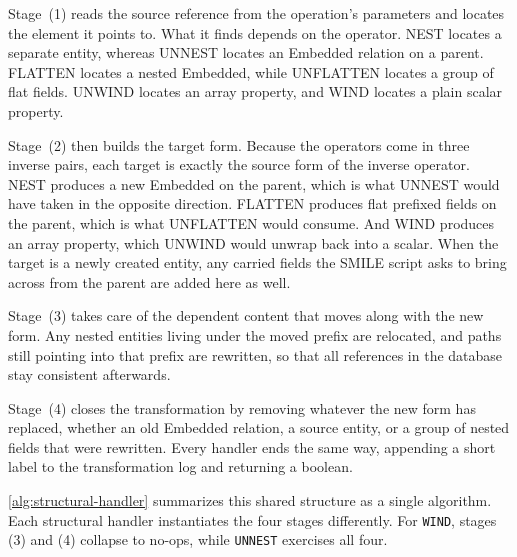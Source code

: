   Stage~(1) reads the source reference from the operation's parameters
  and locates the element it points to. What it finds depends on the
  operator. NEST locates a separate entity, whereas UNNEST locates an
  Embedded relation on a parent. FLATTEN locates a nested Embedded, while
  UNFLATTEN locates a group of flat fields. UNWIND locates an array
  property, and WIND locates a plain scalar property.

Stage~(2) then builds the target form. Because the operators come in
  three inverse pairs, each target is exactly the source form of the
  inverse operator. NEST produces a new Embedded on the parent, which is
  what UNNEST would have taken in the opposite direction. FLATTEN
  produces flat prefixed fields on the parent, which is what UNFLATTEN
  would consume. And WIND produces an array property, which UNWIND would
  unwrap back into a scalar. When the target is a newly created entity,
  any carried fields the SMILE  script asks to bring across from the
  parent are added here as well.

Stage~(3) takes care of the dependent content that moves along with the
  new form. Any nested entities living under the moved prefix are
  relocated, and paths still pointing into that prefix are rewritten, so
  that all references in the database stay consistent afterwards.

  Stage~(4) closes the transformation by removing whatever the new form
  has replaced, whether an old Embedded relation, a source entity, or a
  group of nested fields that were rewritten. Every handler ends the same
  way, appending a short label to the transformation log and returning a
  boolean.

  \autoref{alg:structural-handler} summarizes this shared structure as a
  single algorithm. Each structural handler instantiates the four stages
  differently. For \texttt{WIND}, stages (3) and (4) collapse to no-ops,
  while \texttt{UNNEST} exercises all four.

